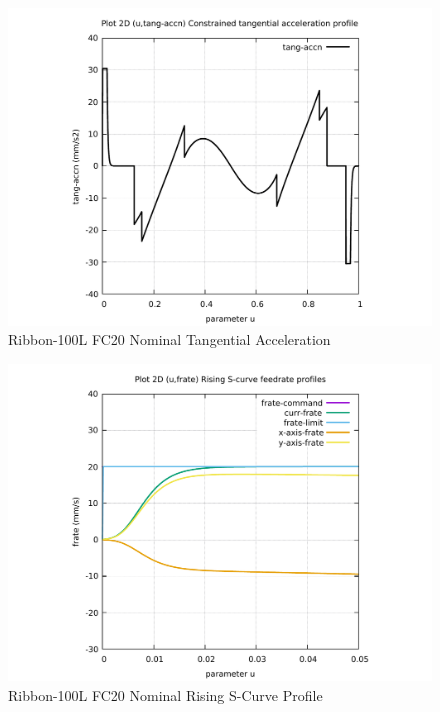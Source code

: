 \begin{figure}
	\caption     {Ribbon-100L FC20 Nominal Tangential Acceleration}
	\label{14-img-Ribbon-100L-FC20-Nominal-Tangential-Acceleration.pdf}
\includegraphics[width=1.00\textwidth]{Chap4/appendix/app-Ribbon-100L/plots/14-img-Ribbon-100L-FC20-Nominal-Tangential-Acceleration.pdf}
\end{figure}

\clearpage
\pagebreak

\begin{figure}
	\caption     {Ribbon-100L FC20 Nominal Rising S-Curve Profile}
	\label{15-img-Ribbon-100L-FC20-Nominal-Rising-S-Curve-Profile.pdf}
\includegraphics[width=1.00\textwidth]{Chap4/appendix/app-Ribbon-100L/plots/15-img-Ribbon-100L-FC20-Nominal-Rising-S-Curve-Profile.pdf}
\end{figure}


